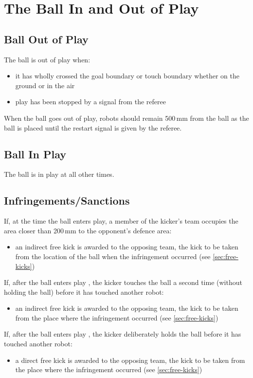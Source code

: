 \section{The Ball In and Out of Play}\label{sec:ball-in-and-out-of-play}

\subsection{Ball Out of Play}
The ball is out of play when:
\begin{itemize}
\item it has wholly crossed the goal boundary or touch boundary whether on the ground or in the air
\item play has been stopped by a signal from the referee
\end{itemize}

When the ball goes out of play, robots should remain 500\,mm from the ball as the ball is placed\removed{,} until the restart signal is given by the referee.

\subsection{Ball In Play}
The ball is in play at all other times.

\subsection{Infringements/Sanctions}
If, at the time the ball enters play, a member of the kicker's team occupies the area closer than 200\,mm to the opponent's defence area:
\begin{itemize}
\item an indirect free kick is awarded to the opposing team, the kick to be taken from the location of the ball when the infringement occurred (see \autoref{sec:free-kicks})
\end{itemize}

If, after the ball enters play , the kicker touches the ball a second time (without holding the ball) before it has touched another robot:
\begin{itemize}
\item an indirect free kick is awarded to the opposing team, the kick to be taken from the place where the infringement occurred (see \autoref{sec:free-kicks})
\end{itemize}

If, after the ball enters play , the kicker deliberately holds the ball before it has touched another robot:
\begin{itemize}
\item a direct free kick is awarded to the opposing team, the kick to be taken from the place where the infringement occurred (see \autoref{sec:free-kicks})
\end{itemize}

